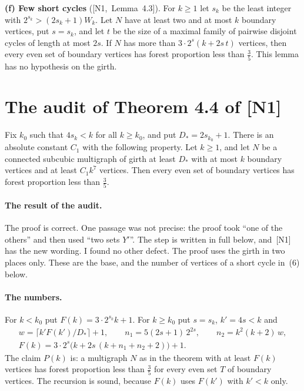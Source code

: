 \documentclass[11pt]{article}
\newcommand{\N}[1]{[N1,~#1]}
\begin{document}
\begin{fineprint}
\smallskip
\textbf{(f) Few short cycles} (\N{Lemma~4.3}). For $k\ge1$ let $s_k$ be the least integer with
$2^{s_k}>(2s_k+1)W_k$. Let $N$ have at least two and at most $k$ boundary vertices, put $s=s_k$,
and let $t$ be the size of a maximal family of pairwise disjoint cycles of length at most $2s$.
If $N$ has more than $3\cdot2^{s}(k+2s\,t)$ vertices, then every even set of boundary vertices
has forest proportion less than $\frac35$. This lemma has no hypothesis on the girth.
\end{fineprint}

\section{The audit of Theorem 4.4 of [N1]}\label{sec:audit}

\begin{theorem}[{\N{Theorem~4.4}}]\label{thm:old}
Fix $k_0$ such that $4s_k<k$ for all $k\ge k_0$, and put $D_*=2s_{k_0}+1$. There is an absolute
constant $C_1$ with the following property. Let $k\ge1$, and let $N$ be a connected subcubic
multigraph of girth at least $D_*$ with at most $k$ boundary vertices and at least $C_1k^{7}$
vertices. Then every even set of boundary vertices has forest proportion less than $\frac35$.
\end{theorem}

\paragraph{The result of the audit.} The proof is correct. One passage was not precise: the proof
took ``one of the others'' and then used ``two sets $Y'$''. The step is written in full below,
and~[N1] has the new wording. I found no other defect. The proof uses the girth in two places
only. These are the base, and the number of vertices of a short cycle in~(6) below.

\paragraph{The numbers.} For $k<k_0$ put $F(k)=3\cdot2^{s_k}k+1$. For $k\ge k_0$ put $s=s_k$,
$k'=4s<k$ and
\begin{gather*}
  w=\lceil k'F(k')/D_*\rceil+1,\qquad n_1=5(2s+1)\,2^{2s},\qquad n_2=k^{2}(k+2)\,w,\\
  F(k)=3\cdot2^{s}\bigl(k+2s\,(k+n_1+n_2+2)\bigr)+1 .
\end{gather*}
The claim $P(k)$ is: a multigraph $N$ as in the theorem with at least $F(k)$ vertices has forest
proportion less than $\frac35$ for every even set $T$ of boundary vertices. The recursion is
sound, because $F(k)$ uses $F(k')$ with $k'<k$ only.
\end{document}
